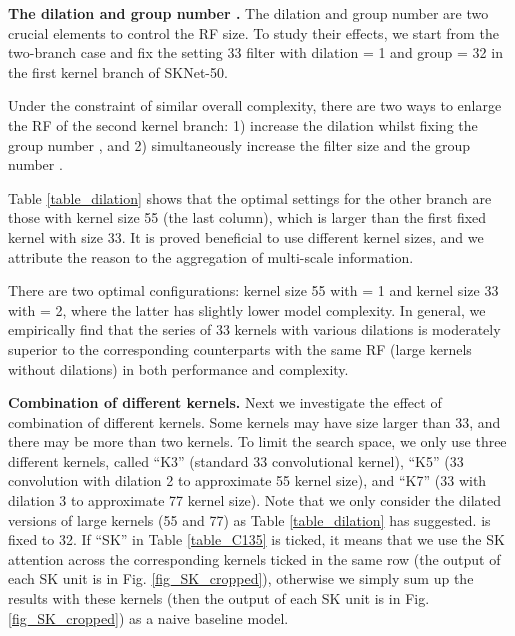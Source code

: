 \documentclass[10pt,twocolumn,letterpaper]{article}
\begin{document}
	
	
	\vspace{6 pt}
	\noindent \textbf{The dilation  and group number .} The dilation  and group number  are two crucial elements to control the RF size. To study their effects, we start from the two-branch case and fix the setting 33 filter with dilation  = 1 and group  = 32 in the first kernel branch of SKNet-50. 

	Under the constraint of similar overall complexity, there are two ways to enlarge the RF of the second kernel branch: 1) increase the dilation  whilst fixing the group number , and 2) simultaneously increase the filter size and the group number .
	
	Table \ref{table_dilation} shows that the optimal settings for the other branch are those with kernel size 55 (the last column), which is larger than the first fixed kernel with size 33. It is proved beneficial to use different kernel sizes, and we attribute the reason to the aggregation of multi-scale information.
	
	{There are two optimal configurations: kernel size 55 with  = 1 and kernel size 33 with  = 2}, where the latter has slightly lower model complexity. In general, we empirically find that the series of 33 kernels with various dilations is moderately superior to the corresponding counterparts with the same RF (large kernels without dilations) in both performance and complexity.
	
	
	\vspace{6 pt}
	\noindent \textbf{Combination of different kernels.} Next we investigate the effect of combination of different kernels. Some kernels may have size larger than 33, and there may be more than two kernels.  
	To limit the search space, we only use three different kernels, called ``K3'' (standard 33 convolutional kernel), ``K5'' (33 convolution with dilation 2 to approximate 55 kernel size), and ``K7'' (33 with dilation 3 to approximate 77 kernel size). Note that  we only consider the dilated versions of large kernels (55 and 77) as Table \ref{table_dilation} has suggested.  is fixed to 32. If ``SK'' in Table \ref{table_C135} is ticked, it means that we use the SK attention across the corresponding kernels {ticked in the same row} ({the output of each SK unit is}  in Fig. \ref{fig_SK_cropped}), otherwise we simply sum up the results with these kernels ({then the output of each SK unit is}  in Fig. \ref{fig_SK_cropped}) as a naive baseline model.
	
\end{document}

